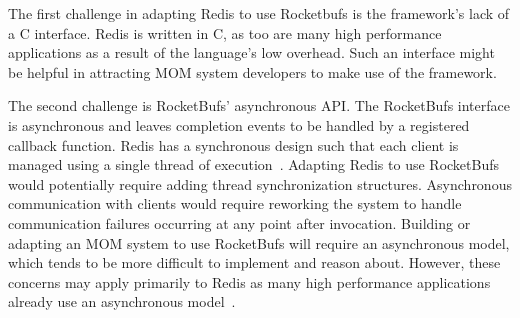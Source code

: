 \documentclass[letterpaper,twocolumn,10pt]{article}
\newcommand{\inlinecode}[1]{\texttt{#1}}
\begin{document}
The first challenge in adapting Redis to use Rocketbufs is the framework's lack of a C interface.
Redis is written in C, as too are many high performance applications as a result of the language's low overhead.
Such an interface might be helpful in attracting MOM system developers to make use of the framework.

The second challenge is RocketBufs' asynchronous API.
The RocketBufs interface is asynchronous and leaves completion events to be handled by a registered callback function.
Redis has a synchronous design such that each client is managed using a single thread of execution~\cite{redis-benchmark}.
Adapting Redis to use RocketBufs would potentially require adding thread synchronization structures. Asynchronous communication with clients would require reworking the system to handle communication failures occurring at any point after invocation.
Building or adapting an MOM system to use RocketBufs will require an asynchronous model, which tends to be more difficult to implement and reason about.
However, these concerns may apply primarily to Redis as many high performance applications already use an asynchronous model~\cite{10.1145/3359993.3366766}.




%
\end{document}
